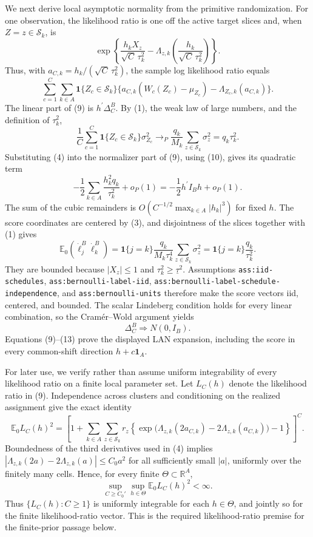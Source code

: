 We next derive local asymptotic normality from the primitive randomization.  For one observation, the likelihood ratio is one off the active target slices and, when \(Z=z\in\mathcal S_k\), is
\[
\exp\!\left\{\frac{h_kX_z}{\sqrt C\,\tau_k^2}
-\Lambda_{z,k}\!\left(\frac{h_k}{\sqrt C\,\tau_k^2}\right)\right\}.
\tag{8}
\]
Thus, with \(a_{C,k}=h_k/(\sqrt C\,\tau_k^2)\), the sample log likelihood ratio equals
\[
\sum_{c=1}^C\sum_{k\in A}\mathbf1\{Z_c\in\mathcal S_k\}
\{a_{C,k}(W_c(Z_c)-\mu_{Z_c})-\Lambda_{Z_c,k}(a_{C,k})\}.
\tag{9}
\]
The linear part of (9) is \(h^{\prime}\Delta_C^B\).  By (1), the weak law of large numbers, and the definition of \(\tau_k^2\),
\[
\frac1C\sum_{c=1}^C
\mathbf1\{Z_c\in\mathcal S_k\}\sigma_{Z_c}^2
\longrightarrow_P
\frac{q_k}{M_k}\sum_{z\in\mathcal S_k}\sigma_z^2
=q_k\tau_k^2.
\tag{10}
\]
Substituting (4) into the normalizer part of (9), using (10), gives its quadratic term
\[
-\frac12\sum_{k\in A}\frac{h_k^2q_k}{\tau_k^2}+o_P(1)
=-\frac12h^{\prime}I_Bh+o_P(1).
\tag{11}
\]
The sum of the cubic remainders is \(O(C^{-1/2}\max_{k\in A}|h_k|^3)\) for fixed \(h\).  The score coordinates are centered by (3), and disjointness of the slices together with (1) gives
\[
\mathbb E_0(\dot\ell_j^B\dot\ell_k^B)
=\mathbf1\{j=k\}\frac{q_k}{M_k\tau_k^4}
\sum_{z\in\mathcal S_k}\sigma_z^2
=\mathbf1\{j=k\}\frac{q_k}{\tau_k^2}.
\tag{12}
\]
They are bounded because \(|X_z|\leq1\) and \(\tau_k^2\geq\underline\tau^2\).  Assumptions \texttt{ass:iid-schedules}, \texttt{ass:bernoulli-label-iid}, \texttt{ass:bernoulli-label-schedule-independence}, and \texttt{ass:bernoulli-units} therefore make the score vectors iid, centered, and bounded.  The scalar Lindeberg condition holds for every linear combination, so the Cram\'{e}r--Wold argument yields
\[
\Delta_C^B\Rightarrow N(0,I_B).
\tag{13}
\]
Equations (9)--(13) prove the displayed LAN expansion, including the score in every common-shift direction \(h+c\mathbf1_A\).

For later use, we verify rather than assume uniform integrability of every likelihood ratio on a finite local parameter set.  Let \(L_C(h)\) denote the likelihood ratio in (9).  Independence across clusters and conditioning on the realized assignment give the exact identity
\[
\mathbb E_0L_C(h)^2
=\left[
1+\sum_{k\in A}\sum_{z\in\mathcal S_k}r_z
\left\{\exp\bigl(\Lambda_{z,k}(2a_{C,k})
-2\Lambda_{z,k}(a_{C,k})\bigr)-1\right\}
\right]^C.
\tag{14}
\]
Boundedness of the third derivatives used in (4) implies
\(\left|\Lambda_{z,k}(2a)-2\Lambda_{z,k}(a)\right|\leq C_0a^2\) for all sufficiently small \(|a|\), uniformly over the finitely many cells.  Hence, for every finite \(\Theta\subset\mathbb R^A\),
\[
\sup_{C\geq C_0'}\sup_{h\in\Theta}\mathbb E_0L_C(h)^2<\infty.
\tag{15}
\]
Thus \(\{L_C(h):C\geq1\}\) is uniformly integrable for each \(h\in\Theta\), and jointly so for the finite likelihood-ratio vector.  This is the required likelihood-ratio premise for the finite-prior passage below.

